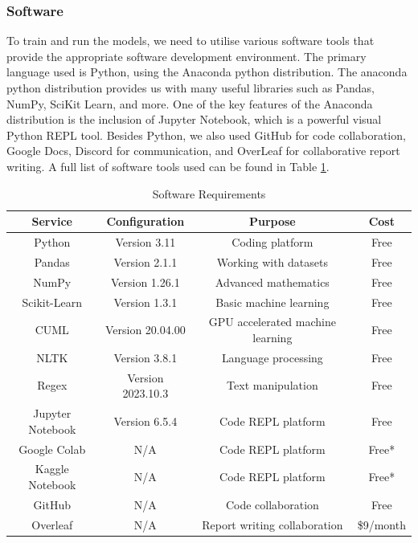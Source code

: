 \documentclass[stu,12pt,floatsintext]{apa7}
\begin{document}
\subsubsection{Software}
To train and run the models, we need to utilise various software tools that provide the appropriate software development environment. The primary language used is Python, using the Anaconda python distribution. The anaconda python distribution provides us with many useful libraries such as Pandas, NumPy, SciKit Learn, and more. One of the key features of the Anaconda distribution is the inclusion of Jupyter Notebook, which is a powerful visual Python REPL tool. Besides Python, we also used GitHub for code collaboration, Google Docs, Discord for communication, and OverLeaf for collaborative report writing. A full list of software tools used can be found in Table \ref{tab:software}.


\begin{table}[!htb]
    \centering
    \caption{Software Requirements}
    \begin{tabular}{cccc}
    \hline
         Service& Configuration  &Purpose& Cost \\
         \hline
         Python & Version 3.11  &Coding platform& Free \\
         Pandas & Version 2.1.1  &Working with datasets& Free \\
         NumPy & Version 1.26.1  &Advanced mathematics& Free \\
         Scikit-Learn & Version 1.3.1  &Basic machine learning& Free \\
         CUML & Version 20.04.00  &GPU accelerated machine learning& Free \\
         NLTK & Version 3.8.1  &Language processing& Free \\
         Regex & Version 2023.10.3  &Text manipulation& Free \\
         Jupyter Notebook & Version 6.5.4  &Code REPL platform& Free\\
         Google Colab & N/A  &Code REPL platform& Free*\\
         Kaggle Notebook & N/A  &Code REPL platform& Free*\\
         GitHub & N/A  &Code collaboration& Free \\
         Overleaf & N/A  &Report writing collaboration& \$9/month \\ 
         \hline
    \end{tabular}
    \label{tab:software}
\end{table}
\end{document}
